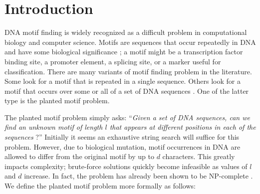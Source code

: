 \documentclass{acm_proc_article-sp}
\begin{document}
\section{Introduction}
	DNA motif finding is widely recognized as a difficult problem in computational biology and computer science. Motifs are sequences that occur repeatedly in DNA and have some biological significance \cite{das2007survey}; a motif might be a transcription factor binding site, a promoter element, a splicing site, or a marker useful for classification. There are many variants of motif finding problem in the literature. Some look for a motif that is repeated in a single sequence. Others look for a motif that occurs over some or all of a set of DNA sequences \cite{dasari2010efficient}. One of the latter type is the planted motif problem.


	The planted motif problem simply asks: ``\emph{Given a set of DNA sequences, can we find an unknown motif of length $l$ that appears at different positions in each of the sequences} \cite{pevzner2000combinatorial}?'' Initially it seems an exhaustive string search will suffice for this problem. However, due to biological mutation, motif occurrences in DNA are allowed to differ from the original motif by up to $d$ characters. This greatly impacts complexity; brute-force solutions quickly become infeasible as values of $l$ and $d$ increase. In fact, the problem has already been shown to be NP-complete \cite{pms2014}. We define the planted motif problem more formally as follows:
\end{document}
